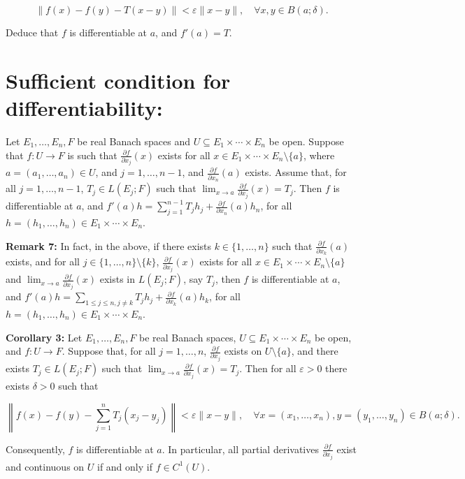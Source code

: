 \documentclass{book}
\begin{document}
\[
\|f(x) - f(y) - T(x - y)\| < \varepsilon \|x - y\|, \quad \forall x, y \in B(a; \delta).
\]

Deduce that $f$ is differentiable at $a$, and $f'(a) = T$.


\section*{\textbf{Sufficient condition for differentiability:}}
Let $E_1, \ldots, E_n, F$ be real Banach spaces and $U \subseteq E_1 \times \cdots \times E_n$ be open. Suppose that $f : U \to F$ is such that $\frac{\partial f}{\partial x_j}(x)$ exists for all $x \in E_1 \times \cdots \times E_n \setminus \{a\}$, where $a = (a_1, \ldots, a_n) \in U$, and $j = 1, \ldots, n - 1$, and $\frac{\partial f}{\partial x_n}(a)$ exists. Assume that, for all $j = 1, \ldots, n - 1$, $T_j \in L(E_j; F)$ such that $\lim_{x \to a} \frac{\partial f}{\partial x_j}(x) = T_j$. Then $f$ is differentiable at $a$, and $f'(a)h = \sum_{j=1}^{n-1} T_j h_j + \frac{\partial f}{\partial x_n}(a) h_n$, for all $h = (h_1, \ldots, h_n) \in E_1 \times \cdots \times E_n$.

\textbf{Remark 7:} In fact, in the above, if there exists $k \in \{1, \ldots, n\}$ such that $\frac{\partial f}{\partial x_k}(a)$ exists, and for all $j \in \{1, \ldots, n\} \setminus \{k\}$, $\frac{\partial f}{\partial x_j}(x)$ exists for all $x \in E_1 \times \cdots \times E_n \setminus \{a\}$ and $\lim_{x \to a} \frac{\partial f}{\partial x_j}(x)$ exists in $L(E_j; F)$, say $T_j$, then $f$ is differentiable at $a$, and $f'(a)h = \sum_{1 \leq j \leq n, j \neq k} T_j h_j + \frac{\partial f}{\partial x_k}(a) h_k$, for all $h = (h_1, \ldots, h_n) \in E_1 \times \cdots \times E_n$.

\textbf{Corollary 3:} Let $E_1, \ldots, E_n, F$ be real Banach spaces, $U \subseteq E_1 \times \cdots \times E_n$ be open, and $f : U \to F$. Suppose that, for all $j = 1, \ldots, n$, $\frac{\partial f}{\partial x_j}$ exists on $U \setminus \{a\}$, and there exists $T_j \in L(E_j; F)$ such that $\lim_{x \to a} \frac{\partial f}{\partial x_j}(x) = T_j$. Then for all $\varepsilon > 0$ there exists $\delta > 0$ such that

\[
\left\| f(x) - f(y) - \sum_{j=1}^{n} T_j (x_j - y_j) \right\| < \varepsilon \|x - y\|, \quad \forall x = (x_1, \ldots, x_n), y = (y_1, \ldots, y_n) \in B(a; \delta).
\]

Consequently, $f$ is differentiable at $a$. In particular, all partial derivatives $\frac{\partial f}{\partial x_j}$ exist and continuous on $U$ if and only if $f \in C^1(U)$.
\end{document}
